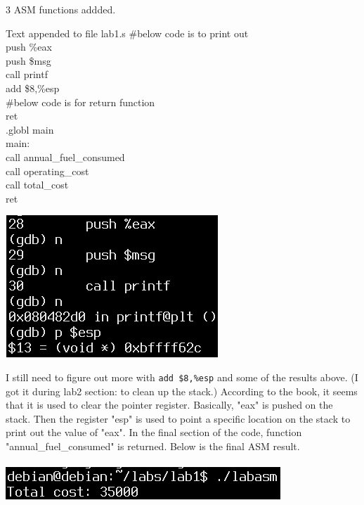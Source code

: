 \documentclass{article}
\begin{document}
\begin{multicols}{2}
\hypertarget{7}{3 ASM functions addded.}
\begin{GFT}{Text appended to file lab1.s}
\+  \#below code is to print out\\
\+  push \%eax\\
\+  push \$msg\\
\+  call printf\\
\+  add \$8,\%esp \\
\+  \#below code is for return function\\
\+ ret\\
\+ .globl main\\
\+main:\\
\+ call annual\_fuel\_consumed\\
\+ call operating\_cost\\
\+ call total\_cost\\
\+ ret\\
\end{GFT}
\columnbreak
\raggedleft
\includegraphics[scale=0.5]{printasm.png}
\end{multicols}
I still need to figure out more with \verb|add $8,%esp| and some of the results above. (I got it during lab2 section: to clean up the stack.)  According to the book, it seems that it is used to clear the pointer register. Basically, "eax" is pushed on the stack. Then the register "esp" is used to point a specific location on the stack to print out the value of "eax". In the final section of the code, function "annual_fuel_consumed" is returned. Below is the final ASM result.\\ 
\bigskip \\
\includegraphics[scale =0.6]{resultasm.png} \\
\noindent{\color{red}\rule{\linewidth}{0.5mm}} \\
\clearpage
\end{document}
